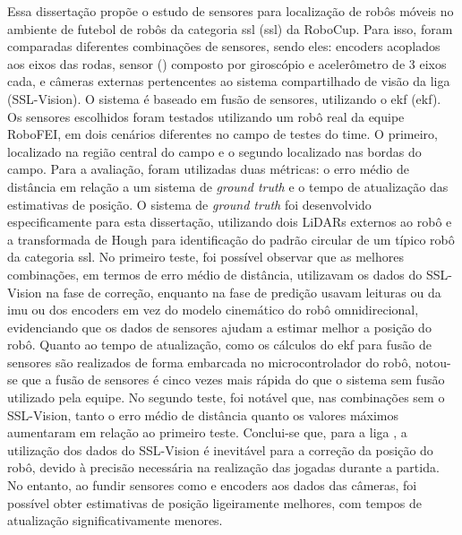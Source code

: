 \documentclass[acronym, symbols, table, deposito]{fei}
\begin{document}
\begin{resumo}

	Essa dissertação propõe o estudo de sensores para localização de robôs móveis no ambiente de futebol de robôs da categoria \acrlong{ssl} (\acrshort{ssl}) da RoboCup. Para isso, foram comparadas diferentes combinações de sensores, sendo eles: encoders acoplados aos eixos das rodas, sensor  () composto por giroscópio e acelerômetro de 3 eixos cada, e câmeras externas pertencentes ao sistema compartilhado de visão da liga (SSL-Vision). O sistema é baseado em fusão de sensores, utilizando o \acrlong{ekf} (\acrshort{ekf}). Os sensores escolhidos foram testados utilizando um robô real da equipe RoboFEI, em dois cenários diferentes no campo de testes do time. O primeiro, localizado na região central do campo e o segundo localizado nas bordas do campo. Para a avaliação, foram utilizadas duas métricas: o erro médio de distância em relação a um sistema de \textit{ground truth} e o tempo de atualização das estimativas de posição. O sistema de \textit{ground truth} foi desenvolvido especificamente para esta dissertação, utilizando dois LiDARs externos ao robô e a transformada de Hough para identificação do padrão circular de um típico robô da categoria \acrshort{ssl}. No primeiro teste, foi possível observar que as melhores combinações, em termos de erro médio de distância, utilizavam os dados do SSL-Vision na fase de correção, enquanto na fase de predição usavam leituras ou da \acrshort{imu} ou dos encoders em vez do modelo cinemático do robô omnidirecional, evidenciando que os dados de sensores ajudam a estimar melhor a posição do robô. Quanto ao tempo de atualização, como os cálculos do \acrshort{ekf} para fusão de sensores são realizados de forma embarcada no microcontrolador do robô, notou-se que a fusão de sensores é cinco vezes mais rápida do que o sistema sem fusão utilizado pela equipe. No segundo teste, foi notável que, nas combinações sem o SSL-Vision, tanto o erro médio de distância quanto os valores máximos aumentaram em relação ao primeiro teste. Conclui-se que, para a liga , a utilização dos dados do SSL-Vision é inevitável para a correção da posição do robô, devido à precisão necessária na realização das jogadas durante a partida. No entanto, ao fundir sensores como  e encoders aos dados das câmeras, foi possível obter estimativas de posição ligeiramente melhores, com tempos de atualização significativamente menores.
	

\end{resumo}
\end{document}
